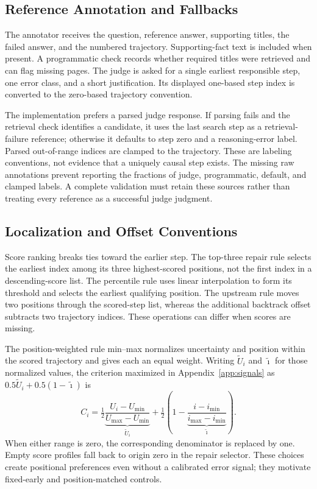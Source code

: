 \documentclass{article}
\begin{document}
\subsection{Reference Annotation and Fallbacks}
The annotator receives the question, reference answer, supporting titles,
the failed answer, and the numbered trajectory. Supporting-fact text is
included when present. A programmatic check records whether required
titles were retrieved and can flag missing pages. The judge is asked for
a single earliest responsible step, one error class, and a short
justification. Its displayed one-based step index is converted to the
zero-based trajectory convention.

The implementation prefers a parsed judge response. If parsing fails and
the retrieval check identifies a candidate, it uses the last search step
as a retrieval-failure reference; otherwise it defaults to step zero and
a reasoning-error label. Parsed out-of-range indices are clamped to the
trajectory. These are labeling conventions, not evidence that a uniquely
causal step exists. The missing raw annotations prevent reporting the
fractions of judge, programmatic, default, and clamped labels. A complete
validation must retain these sources rather than treating every reference
as a successful judge judgment.

\subsection{Localization and Offset Conventions}
Score ranking breaks ties toward the earlier step. The top-three repair
rule selects the earliest index among its three highest-scored positions,
not the first index in a descending-score list. The percentile rule uses
linear interpolation to form its threshold and selects the earliest
qualifying position. The upstream rule moves two positions through the
scored-step list, whereas the additional backtrack offset subtracts two
trajectory indices. These operations can differ when scores are missing.

The position-weighted rule min--max normalizes uncertainty and position
within the scored trajectory and gives each an equal weight. Writing
$\widetilde U_i$ and $\widetilde\imath$ for those normalized values, the
criterion maximized in Appendix~\ref{app:signals} as
$0.5\widetilde U_i+0.5(1-\widetilde\imath)$ is
\begin{equation}
 C_i = \tfrac12\underbrace{\frac{U_i-U_{\min}}{U_{\max}-U_{\min}}}_{\widetilde U_i}
       +\tfrac12\left(1-\underbrace{\frac{i-i_{\min}}{i_{\max}-i_{\min}}}_{\widetilde\imath}\right).
  \label{eq:position_weighted}
\end{equation}
When either range is zero, the corresponding denominator is replaced by
one. Empty score profiles fall back to origin zero in the repair selector.
These choices create positional preferences even without a calibrated
error signal; they motivate fixed-early and position-matched controls.
\end{document}
